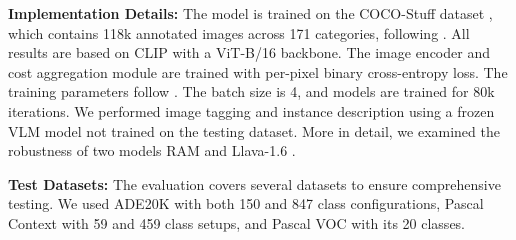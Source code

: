 \textbf{Implementation Details:}
The model is trained on the COCO-Stuff dataset \cite{caesar2018coco}, which contains 118k annotated images across 171 categories, following \cite{cho2024cat}. All results are based on CLIP \cite{radford2021learning} with a ViT-B/16 backbone. The image encoder and cost aggregation module are trained with per-pixel binary cross-entropy loss. 
The training parameters follow \cite{cho2024cat}. The batch size is 4, and models are trained for 80k iterations.
We performed image tagging and instance description using a frozen VLM model not trained on the testing dataset. More in detail, we examined the robustness of two models RAM \cite{zhang2024recognize} and Llava-1.6  \cite{liu2024llavanext}.

\textbf{Test Datasets:} The evaluation covers several datasets to ensure comprehensive testing. We used ADE20K \cite{zhou2019semantic} with both 150 and 847 class configurations, Pascal Context \cite{mottaghi2014role} with 59 and 459 class setups, and Pascal VOC \cite{everingham2010pascal} with its 20 classes. 

